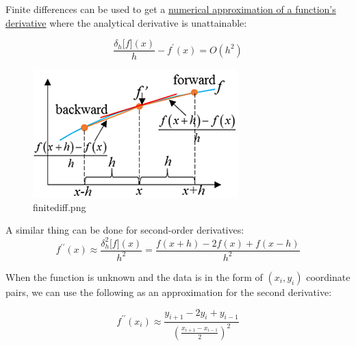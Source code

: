 \documentclass[11pt]{article}
\begin{document}
Finite differences can be used to get a
\href{https://en.wikipedia.org/wiki/Finite_differences\#Relation_with_derivatives}{numerical
approximation of a function's derivative} where the analytical
derivative is unattainable:

\begin{equation}
\frac{\delta_h \lbrack f \rbrack (x)}{h} - f^\prime(x) = O(h^2)
\end{equation}

\begin{figure}
\centering
\includegraphics{finitediff.png}
\caption{finitediff.png}
\end{figure}

A similar thing can be done for second-order derivatives:
\begin{equation}
f^{\prime\prime}(x) \approx \frac{\delta_h^2 \lbrack f\rbrack (x)}{h^2} = \frac{f(x+h)-2f(x)+f(x-h)}{h^2}
\end{equation}

When the function is unknown and the data is in the form of
\((x_i,y_i)\) coordinate pairs, we can use the following as an
approximation for the second derivative:

\begin{equation}
f^{\prime\prime}(x_i) \approx \frac{y_{i+1} - 2y_i + y_{i-1}}{\left(\frac{x_{i+1}-x_{i-1}}{2}\right)^2}
\end{equation}
\end{document}
